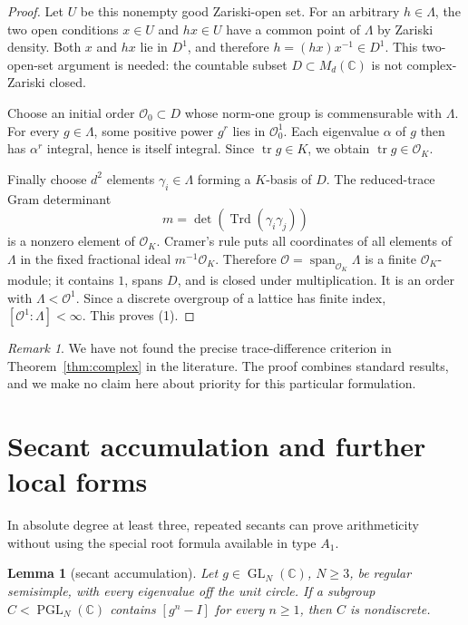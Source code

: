 \documentclass[11pt,reqno]{amsart}
\newtheorem{lemma}[theorem]{Lemma}
\theoremstyle{definition}
\theoremstyle{remark}
\newtheorem{remark}[theorem]{Remark}
\newcommand{\C}{\mathbb C}
\newcommand{\cO}{\mathcal O}
\newcommand{\Tr}{\operatorname{tr}}
\newcommand{\Trd}{\operatorname{Trd}}
\newcommand{\Span}{\operatorname{span}}
\newcommand{\GL}{\operatorname{GL}}
\newcommand{\PGL}{\operatorname{PGL}}
\begin{document}
\begin{proof}
Let \(U\) be this nonempty good Zariski-open set.  For an arbitrary
\(h\in\Lambda\), the two open conditions \(x\in U\) and \(hx\in U\) have a
common point of \(\Lambda\) by Zariski density.  Both \(x\) and \(hx\) lie in
\(D^1\), and therefore \(h=(hx)x^{-1}\in D^1\).  This two-open-set argument is
needed: the countable subset \(D\subset M_d(\C)\) is not complex-Zariski
closed.

Choose an initial order \(\cO_0\subset D\) whose norm-one group is
commensurable with \(\Lambda\).  For every \(g\in\Lambda\), some positive
power \(g^r\) lies in \(\cO_0^1\).  Each eigenvalue \(\alpha\) of \(g\) then
has \(\alpha^r\) integral, hence is itself integral.  Since \(\Tr g\in K\),
we obtain \(\Tr g\in\cO_K\).

Finally choose \(d^2\) elements \(\gamma_i\in\Lambda\) forming a \(K\)-basis
of \(D\).  The reduced-trace Gram determinant
\[
 m=\det(\Trd(\gamma_i\gamma_j))
\]
is a nonzero element of \(\cO_K\).  Cramer's rule puts all coordinates of all
elements of \(\Lambda\) in the fixed fractional ideal \(m^{-1}\cO_K\).
Therefore \(\cO=\Span_{\cO_K}\Lambda\) is a finite \(\cO_K\)-module; it
contains \(1\), spans \(D\), and is closed under multiplication.  It is an order
with \(\Lambda<\cO^1\).  Since a discrete overgroup of a lattice has finite
index, \([\cO^1:\Lambda]<\infty\).  This proves (1).
\end{proof}

\begin{remark}
We have not found the precise trace-difference criterion in
Theorem~\ref{thm:complex} in the literature.  The proof combines standard
results, and we make no claim here about priority for this particular
formulation.
\end{remark}

\section{Secant accumulation and further local forms}

In absolute degree at least three, repeated secants can prove arithmeticity
without using the special root formula available in type \(A_1\).

\begin{lemma}[secant accumulation]\label{lem:secant-accumulation}
Let \(g\in\GL_N(\C)\), \(N\ge3\), be regular semisimple, with every eigenvalue
off the unit circle.  If a subgroup \(C<\PGL_N(\C)\) contains
\([g^n-I]\) for every \(n\ge1\), then \(C\) is nondiscrete.
\end{lemma}
\end{document}
